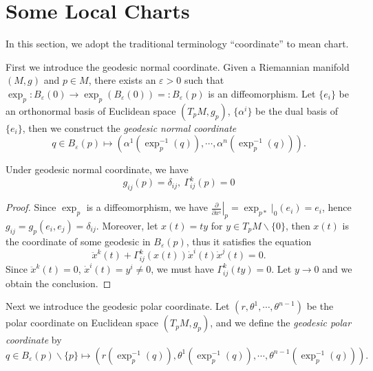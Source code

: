 \section{Some Local Charts}
In this section, we adopt the traditional terminology ``coordinate'' to mean chart.

First we introduce the geodesic normal coordinate.
Given a Riemannian manifold $(M,g)$ and $p\in M$, there exists an $\varepsilon>0$ such that $\exp_p:B_\varepsilon(0)\to\exp_p(B_\varepsilon(0))=:B_\varepsilon(p)$ is an diffeomorphism.
Let $\{e_i\}$ be an orthonormal basis of Euclidean space $(T_pM,g_p)$, $\{\alpha^i\}$ be the dual basis of $\{e_i\}$, then we construct the \emph{geodesic normal coordinate}
\[q\in B_\varepsilon(p)\mapsto(\alpha^1(\exp_p^{-1}(q)),\cdots,\alpha^n(\exp_p^{-1}(q))).\]

\begin{prop}
    Under geodesic normal coordinate, we have
    \[g_{ij}(p)=\delta_{ij},\ \Gamma^k_{ij}(p)=0\]
\end{prop}
\begin{proof}
    Since $\exp_p$ is a diffeomorphism, we have $\left.\frac{\partial{}}{\partial{x^i}}\right|_p=\exp_{p*}|_0(e_i)=e_i$, hence $g_{ij}=g_p(e_i,e_j)=\delta_{ij}$.
    Moreover, let $x(t)=ty$ for $y\in T_pM\backslash\{0\}$, then $x(t)$ is the coordinate of some geodesic in $B_\varepsilon(p)$, thus it satisfies the equation
    \[\ddot{x}^k(t)+\Gamma^k_{ij}(x(t))\dot{x}^i(t)\dot{x}^j(t)=0.\]
    Since $\ddot{x}^k(t)=0$, $\dot{x}^i(t)=y^i\neq 0$, we must have $\Gamma^k_{ij}(ty)=0$.
    Let $y\to 0$ and we obtain the conclusion.
\end{proof}

Next we introduce the geodesic polar coordinate.
Let $(r,\theta^1,\cdots,\theta^{n-1})$ be the polar coordinate on Euclidean space $(T_pM,g_p)$, and we define the \emph{geodesic polar coordinate} by
\[q\in B_\varepsilon(p)\backslash\{p\}\mapsto(r(\exp_p^{-1}(q)),\theta^1(\exp_p^{-1}(q)),\cdots,\theta^{n-1}(\exp_p^{-1}(q))).\]

